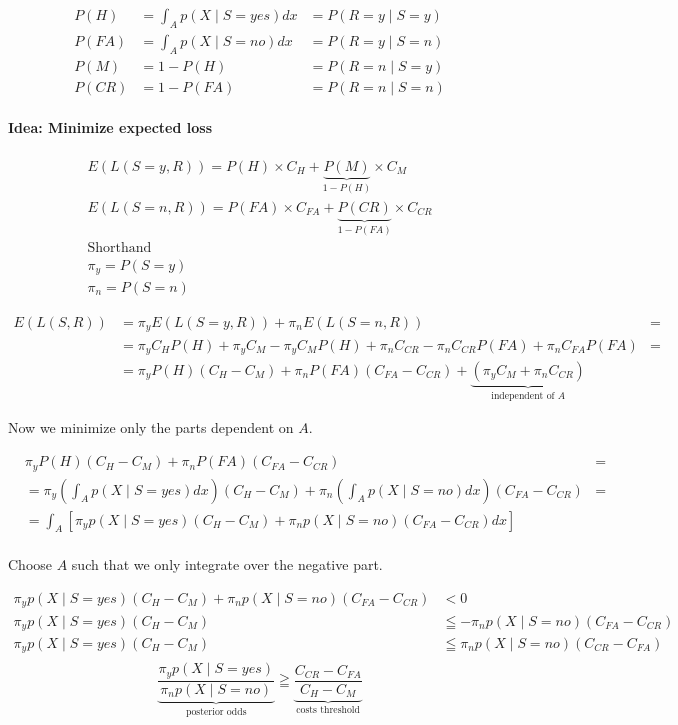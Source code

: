 \documentclass[../main/Notes.tex]{subfiles}
\begin{document}
\begin{align}
P(H) &= \int_A p(X \mid S=yes)dx &= P(R=y \mid S=y) \\
P(FA) &= \int_A p(X \mid S=no)dx &= P(R=y \mid S=n) \\
P(M)  &= 1 - P(H) &= P(R=n \mid S=y)\\
P(CR) &= 1 - P(FA) &= P(R=n \mid S=n)
\end{align}

\paragraph{Idea: Minimize expected loss }

\begin{gather*}
E(L(S=y,R)) = P(H) \times C_H +  \underbrace{P(M)}_{1-P(H)} \times C_M \\
E(L(S=n,R)) = P(FA) \times C_{FA} +  \underbrace{P(CR)}_{1-P(FA)} \times C_{CR} \\
\text{Shorthand} \\
\pi_y = P(S=y) \\
\pi_n = P(S=n)
\end{gather*}

\begin{align*}
E(L(S,R)) &= \pi_y  E(L(S=y, R)) + \pi_n E(L(S=n, R)) &= \\
&= \pi_y C_H  P(H) + \pi_y C_M - \pi_y C_M P(H) + \pi_n C_{CR} - \pi_n C_{CR} P(FA) + \pi_n C_{FA} P(FA) &= \\
&= \pi_y P(H) (C_H - C_M) + \pi_n P(FA) (C_{FA} - C_{CR}) + \underbrace{(\pi_y C_M + \pi_n C_{CR})}_{\text{independent of } A} &
\end{align*}

Now we minimize only the parts dependent on $A$.

\begin{align*}
& \pi_y P(H) (C_H - C_M) + \pi_n P(FA) (C_{FA} - C_{CR}) &= \\
&= \pi_y \left(\int_A p(X \mid S=yes) dx\right)(C_H - C_M) + \pi_n \left(\int_A p(X \mid S=no) dx\right) (C_{FA} - C_{CR}) &= \\
&= \int_A \left[\pi_y p(X \mid S=yes)(C_H - C_M) + \pi_n p(X \mid S=no)(C_{FA} - C_{CR}) dx\right] & \\
\end{align*}

Choose $A$ such that we only integrate over the negative part.

\begin{align*}
\pi_y p(X \mid S=yes)(C_H - C_M) + \pi_n p(X \mid S=no)(C_{FA} - C_{CR}) &< 0 \\
\pi_y p(X \mid S=yes)(C_H - C_M) &\leqq - \pi_n p(X \mid S=no)(C_{FA} - C_{CR}) \\
\pi_y p(X \mid S=yes)(C_H - C_M) &\leqq \pi_n p(X \mid S=no)(C_{CR} - C_{FA}) \\
\end{align*}
\begin{equation}
\underbrace{\frac{\pi_y p(X \mid S=yes)}{\pi_n p(X \mid S=no)}}_\text{posterior odds} \geqq \underbrace{\frac{C_{CR} - C_{FA}}{C_H - C_M}}_\text{costs threshold}
\end{equation}
\end{document}
